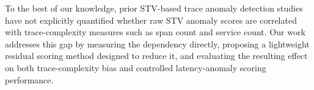 To the best of our knowledge, prior STV-based trace anomaly detection
studies have not explicitly quantified whether raw STV anomaly scores
are correlated with trace-complexity measures such as span count and
service count. Our work addresses this gap by measuring the dependency
directly, proposing a lightweight residual scoring method designed to
reduce it, and evaluating the resulting effect on both trace-complexity
bias and controlled latency-anomaly scoring performance.